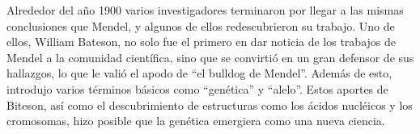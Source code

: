 Alrededor del año 1900 varios investigadores terminaron por llegar a las mismas conclusiones que Mendel, y algunos de ellos redescubrieron su trabajo. Uno de ellos, William Bateson, no solo fue el primero en dar noticia de los trabajos de Mendel a la comunidad científica, sino que se convirtió en un gran defensor de sus hallazgos, lo que le valió el apodo de ``el bulldog de Mendel''. Además de esto, introdujo varios términos básicos como ``genética'' y ``alelo''. Estos aportes de Biteson, así como el descubrimiento de estructuras como los ácidos nucléicos y los cromosomas, hizo posible que la genética emergiera como una nueva ciencia.